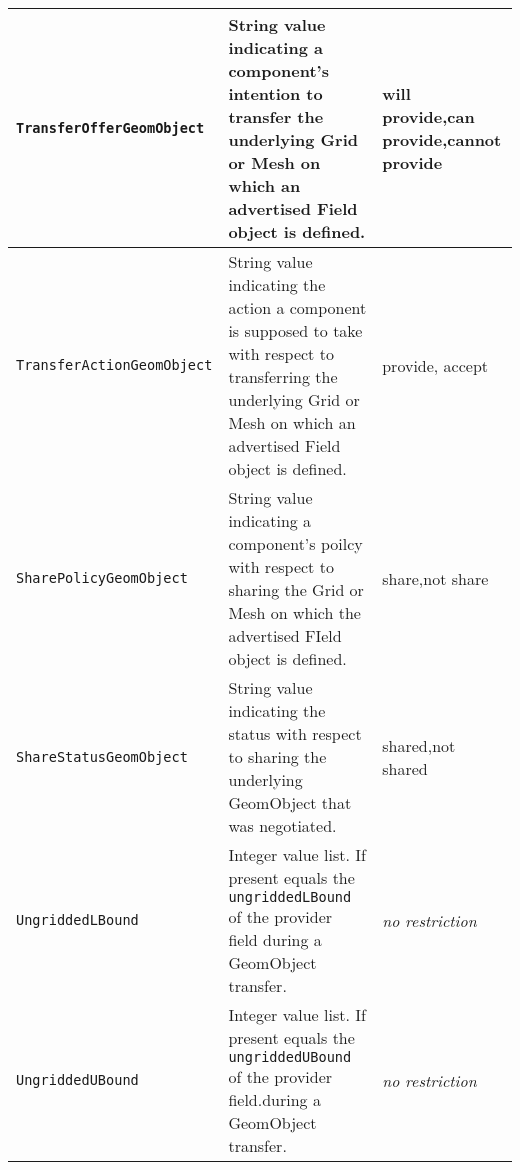 \begin{tabular}{|p{5cm}|p{5cm}|p{35mm}|}
     {\tt TransferOfferGeomObject} & String value indicating a component's intention to transfer the underlying Grid or Mesh on which an advertised Field object is defined.& will provide,\newline can provide,\newline cannot provide\\ \hline
     {\tt TransferActionGeomObject} & String value indicating the action a component is supposed to take with respect to transferring the underlying Grid or Mesh on which an advertised Field object is defined.& provide, accept\\ \hline
     {\tt SharePolicyGeomObject} & String value indicating a component's poilcy with respect to sharing the Grid or Mesh on which the advertised FIeld object is defined.& share,\newline not share\\ \hline
     {\tt ShareStatusGeomObject} & String value indicating the status with respect to sharing the underlying GeomObject that was negotiated.& shared,\newline not shared\\ \hline
     {\tt UngriddedLBound} & Integer value list. If present equals the {\tt ungriddedLBound} of the provider field during a GeomObject transfer. & {\em no restriction}\\ \hline
     {\tt UngriddedUBound} & Integer value list. If present equals the {\tt ungriddedUBound} of the provider field.during a GeomObject transfer. & {\em no restriction}\\ \hline
     \hline
\end{tabular}
